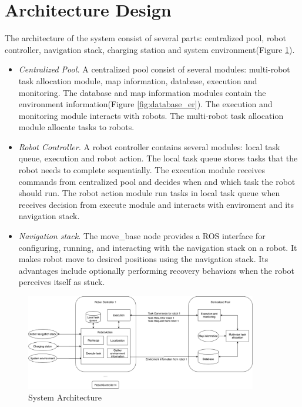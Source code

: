 \section{Architecture Design}

The architecture of the system consist of several parts: centralized pool, robot controller, navigation stack, charging station and system environment(Figure \ref{fig:system_architecture}). 
\begin{itemize}
	\item \textsl{Centralized Pool.} A centralized pool consist of several modules: multi-robot task allocation module, map information, database, execution and monitoring. The database and map information modules contain the environment information(Figure \ref{fig:database_er}). The execution and monitoring module interacts with robots. The multi-robot task allocation module allocate tasks to robots.
	\item \textsl{Robot Controller.} A robot controller contains several modules: local task queue, execution and robot action. The local task queue stores tasks that the robot needs to complete sequentially. The execution module receives commands from centralized pool and decides when and which task the robot should run. The robot action module run tasks in local task queue when receives decision from execute module and interacts with enviroment and its navigation stack.
	\item \textsl{Navigation stack.} The move\_base node provides a ROS interface for configuring, running, and interacting with the navigation stack on a robot. It makes robot move to desired positions using the navigation stack. Its advantages include optionally performing recovery behaviors when the robot perceives itself as stuck\cite{move_base_node}. 
\end{itemize} 

\begin{figure}[htbp]
	\centering
	\includegraphics[width = 0.9\textwidth]{content/images/ch3/architecture.drawio.png}
	\caption{System Architecture}
	\label{fig:system_architecture}
\end{figure}

